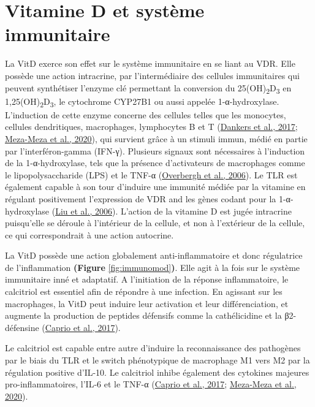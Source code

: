 \documentclass[
  letterpaper,
  DIV=11,
  numbers=noendperiod]{scrartcl}
\begin{document}
\hypertarget{vitamine-d-et-systuxe8me-immunitaire}{%
\section{Vitamine D et système
immunitaire}\label{vitamine-d-et-systuxe8me-immunitaire}}

La VitD exerce son effet sur le système immunitaire en se liant au VDR.
Elle possède une action intracrine, par l'intermédiaire des cellules
immunitaires qui peuvent synthétiser l'enzyme clé permettant la
conversion du 25(OH)\textsubscript{2}D\textsubscript{3} en
1,25(OH)\textsubscript{2}D\textsubscript{3}, le cytochrome CYP27B1 ou
aussi appelée 1-α-hydroxylase. L'induction de cette enzyme concerne des
cellules telles que les monocytes, cellules dendritiques, macrophages,
lymphocytes B et T (\protect\hyperlink{ref-Dankers.2017}{Dankers et al.,
2017}; \protect\hyperlink{ref-Meza-Meza.2020}{Meza-Meza et al., 2020}),
qui survient grâce à un stimuli immun, médié en partie par
l'interféron-gamma (IFN-γ). Plusieurs signaux sont nécessaires à
l'induction de la 1-α-hydroxylase, tels que la présence d'activateurs de
macrophages comme le lipopolysaccharide (LPS) et le TNF-α
(\protect\hyperlink{ref-Overbergh.2006}{Overbergh et al., 2006}). Le TLR
est également capable à son tour d'induire une immunité médiée par la
vitamine en régulant positivement l'expression de VDR and les gènes
codant pour la 1-α-hydroxylase (\protect\hyperlink{ref-Liu.2006}{Liu et
al., 2006}). L'action de la vitamine D est jugée intracrine puisqu'elle
se déroule à l'intérieur de la cellule, et non à l'extérieur de la
cellule, ce qui correspondrait à une action autocrine.

La VitD possède une action globalement anti-inflammatoire et donc
régulatrice de l'inflammation \textbf{(Figure}
\ref{fig:immunomod}\textbf{)}. Elle agit à la fois sur le système
immunitaire inné et adaptatif. A l'initiation de la réponse
inflammatoire, le calcitriol est essentiel afin de répondre à une
infection. En agissant sur les macrophages, la VitD peut induire leur
activation et leur différenciation, et augmente la production de
peptides défensifs comme la cathélicidine et la β2-défensine
(\protect\hyperlink{ref-Caprio.2017}{Caprio et al., 2017}).

Le calcitriol est capable entre autre d'induire la reconnaissance des
pathogènes par le biais du TLR et le switch phénotypique de macrophage
M1 vers M2 par la régulation positive d'IL-10. Le calcitriol inhibe
également des cytokines majeures pro-inflammatoires, l'IL-6 et le TNF-α
(\protect\hyperlink{ref-Caprio.2017}{Caprio et al., 2017};
\protect\hyperlink{ref-Meza-Meza.2020}{Meza-Meza et al., 2020}).
\end{document}
